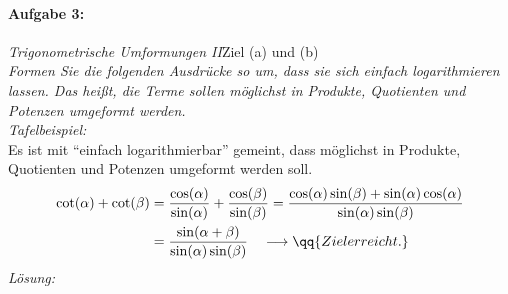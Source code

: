 \paragraph{Aufgabe 3: } \emph{Trigonometrische Umformungen II}\hfill Ziel (a) und (b)\\[0.2cm]
\emph{Formen Sie die folgenden Ausdrücke so um, dass sie sich einfach logarithmieren lassen. Das heißt, die Terme sollen möglichst in Produkte, Quotienten und Potenzen umgeformt werden.}\\[-1.3em]

\emph{Tafelbeispiel:}\\
Es ist mit ``einfach logarithmierbar'' gemeint, dass möglichst in Produkte, Quotienten und Potenzen umgeformt werden soll.
\begin{align}
    \cot(\alpha) + \cot(\beta) &= \frac{\cos(\alpha)}{\sin(\alpha)} + \frac{\cos(\beta)}{\sin(\beta)} = \frac{\cos(\alpha)\sin(\beta)+\sin(\alpha)\cos(\alpha)}{\sin(\alpha)\sin(\beta)} \\
    &= \frac{\sin(\alpha+\beta)}{\sin(\alpha)\sin(\beta)} \quad \longrightarrow \qq{Ziel erreicht.}
\end{align}
\emph{Lösung:}
